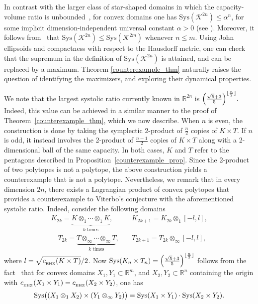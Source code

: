 \documentclass[10pt,a4paper]{article}
\theoremstyle{definition}
\newcommand{\ehzcap}{c_{_{\rm EHZ}}}
\begin{document}
In contrast with the larger class of star-shaped domains in which the capacity-volume ratio is unbounded~\cite{hermann}, for convex domains one has $\mathrm{Sys}(\mathcal K^{2n}) \leq \alpha^n$, for some implicit dimension-independent universal constant $\alpha > 0$ (see \cite{ArtsteinAvidanOstroverMilman}). 
Moreover, it follows from~\cite{p-prod} that 
$\mathrm{Sys}(\mathcal K^{2n}) \leq \mathrm{Sys}(\mathcal K^{2m})$ whenever $n \leq m$.
Using John ellipsoids and compactness with respect to the Hausdorff metric, one can check that the supremum 
 in the definition of $\mathrm{Sys}(\mathcal K^{2n})$ 
 is attained, and can be replaced by a maximum.
Theorem \ref{counterexample_thm} naturally raises the question of identifying the maximizers, and exploring their dynamical properties. 

\medskip 


We note that the largest systolic ratio currently known in ${\mathbb R}^{2n}$ is $ \Bigl( \tfrac{\sqrt{5} + 3}{5} \Bigr)^{\lfloor \frac{n}{2} \rfloor}.$ Indeed, this value can be achieved in a similar manner to the proof of Theorem~\ref{counterexample_thm}, which we now describe. 
When \( n \) is even, the construction is done by taking the symplectic 2-product of \( \frac{n}{2} \) copies of \( K \times T \). If \( n \) is odd, it instead involves the 2-product of \( \frac{n-1}{2} \) copies of \( K \times T \) along with a 2-dimensional ball of the same capacity. In both cases, \( K \) and \( T \) refer to the pentagons described in Proposition~\ref{counterexample_prop}.
Since the 2-product of two polytopes is not a polytope, the above construction yields a counterexample that is not a polytope. Nevertheless, we remark that in every dimension \( 2n \), there exists a Lagrangian product of convex polytopes that provides a counterexample to Viterbo's conjecture  with the aforementioned systolic ratio. 
Indeed, consider the following domains
\begin{align*}
K_{2k} = \underbrace{K \otimes_1 \cdots \otimes_1 K}_{k \text{ times}},& 
\quad K_{2k+1} = K_{2k} \otimes_1 [-l,l],\\
\quad T_{2k} = \underbrace{T \otimes_\infty \cdots \otimes_\infty T}_{k \text{ times}},&
\quad T_{2k+1} = T_{2k} \otimes_\infty [-l,l],
\end{align*}
where $l = \sqrt{\ehzcap(K \times T)}/2$.
Now ${\rm Sys}(K_n \times T_n) = \Bigl( \frac{\sqrt{5} + 3}{5} \Bigr)^{\lfloor \frac{n}{2} \rfloor}$ follows from the fact~\cite[Proposition 5.1.4]{pazit-thesis} that for convex domains $X_1,Y_1 \subset {\mathbb R}^{m}$, and $X_2,Y_2 \subset {\mathbb R}^{n}$ containing the origin with $\ehzcap(X_1 \times Y_1) = \ehzcap(X_2 \times Y_2)$, one has
$$ {\rm Sys} \bigl ((X_1 \otimes_1 X_2) \times (Y_1 \otimes_{\infty} Y_2) \bigr ) = {\rm Sys} (X_1 \times Y_1) \cdot {\rm Sys}(X_2 \times Y_2).$$ 
\end{document}

